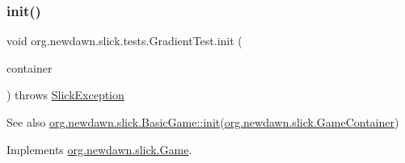 \subsubsection{\texorpdfstring{init()}{init()}}
{\footnotesize\ttfamily void org.\+newdawn.\+slick.\+tests.\+Gradient\+Test.\+init (\begin{DoxyParamCaption}\item[{\mbox{\hyperlink{classorg_1_1newdawn_1_1slick_1_1_game_container}{Game\+Container}}}]{container }\end{DoxyParamCaption}) throws \mbox{\hyperlink{classorg_1_1newdawn_1_1slick_1_1_slick_exception}{Slick\+Exception}}\hspace{0.3cm}{\ttfamily [inline]}}

\begin{DoxySeeAlso}{See also}
\mbox{\hyperlink{classorg_1_1newdawn_1_1slick_1_1_basic_game_a8af0900217e4d389249f71367b22d114}{org.\+newdawn.\+slick.\+Basic\+Game\+::init}}(\mbox{\hyperlink{classorg_1_1newdawn_1_1slick_1_1_game_container}{org.\+newdawn.\+slick.\+Game\+Container}}) 
\end{DoxySeeAlso}


Implements \mbox{\hyperlink{interfaceorg_1_1newdawn_1_1slick_1_1_game_ad2dd6affab08bb8fdb5fab0815957b7a}{org.\+newdawn.\+slick.\+Game}}.


